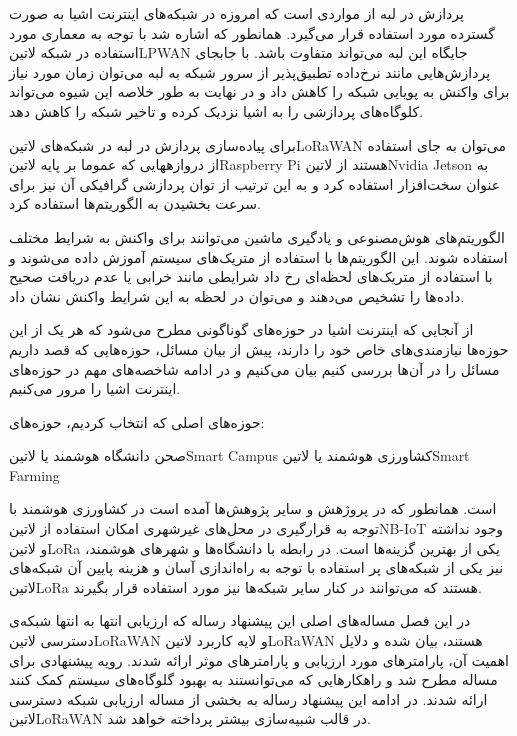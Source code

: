 پردازش در لبه از مواردی است که امروزه در شبکه‌های اینترنت اشیا به صورت گسترده مورد استفاده قرار می‌گیرد.
همانطور که اشاره شد با توجه به معماری مورد استفاده در شبکه ‌لاتین{LPWAN} جایگاه این لبه می‌تواند متفاوت باشد.
با جابجای پردازش‌هایی مانند نرخ‌داده تطبیق‌پذیر از سرور شبکه به لبه می‌توان زمان مورد نیاز برای واکنش به پویایی شبکه را کاهش داد و
در نهایت به طور خلاصه این شیوه می‌تواند کلوگاه‌های پردازشی را به اشیا نزدیک کرده و تاخیر شبکه را کاهش دهد.

برای پیاده‌سازی پردازش در لبه در شبکه‌های ‌لاتین{LoRaWAN} می‌توان به جای استفاده از دروازههایی که عموما بر پایه
‌لاتین{Raspberry Pi} هستند از ‌لاتین{Nvidia Jetson} به عنوان سخت‌افزار استفاده کرد و به این ترتیب از توان پردازشی گرافیکی
آن نیز برای سرعت بخشیدن به الگوریتم‌ها استفاده کرد.


الگوریتم‌های هوش‌مصنوعی و یادگیری ماشین می‌توانند برای واکنش به شرایط مختلف استفاده شوند. این الگوریتم‌ها با استفاده از متریک‌های
سیستم آموزش داده می‌شوند و با استفاده از متریک‌های لحظه‌ای رخ داد شرایطی مانند خرابی یا عدم دریافت صحیح داده‌ها را تشخیص می‌دهند
و می‌توان در لحظه به این شرایط واکنش نشان داد.


از آنجایی که اینترنت اشیا در حوزه‌های گوناگونی مطرح می‌شود که هر یک از این حوزه‌ها نیازمندی‌های خاص خود را دارند، پیش از بیان مسائل، حوزه‌هایی که قصد داریم
مسائل را در آن‌ها بررسی کنیم بیان می‌کنیم و در ادامه شاخصه‌های مهم در حوزه‌های اینترنت اشیا را مرور می‌کنیم.

حوزه‌های اصلی که انتخاب کردیم، حوزه‌های:

 صحن دانشگاه هوشمند یا ‌لاتین{Smart Campus}
 کشاورزی هوشمند یا ‌لاتین{Smart Farming}

است. همانطور که در پروژهش  و سایر پژوهش‌ها آمده است در کشاورزی هوشمند با توجه به قرارگیری در محل‌های غیرشهری امکان استفاده
از ‌لاتین{NB-IoT} وجود نداشته و ‌لاتین{LoRa} یکی از بهترین گزینه‌ها است.
در رابطه با دانشگاه‌ها و شهرهای هوشمند، نیز یکی از شبکه‌های پر استفاده با توجه به راه‌اندازی آسان و هزینه پایین آن شبکه‌های ‌لاتین{LoRa} هستند
که می‌توانند در کنار سایر شبکه‌ها نیز مورد استفاده قرار بگیرند.


در این فصل مساله‌های اصلی این پیشنهاد رساله که ارزیابی انتها به انتها شبکه‌ی دسترسی ‌لاتین{LoRaWAN}
و لایه کاربرد ‌لاتین{LoRaWAN} هستند،
بیان شده و دلایل اهمیت آن، پارامترهای مورد ارزیابی و پارامترهای موثر ارائه شدند.
رویه پیشنهادی برای مساله مطرح شد و راهکارهایی که می‌توانستند به بهبود گلوگاه‌های سیستم کمک کنند ارائه شدند.
در ادامه این پیشنهاد رساله به بخشی از مساله ارزیابی شبکه دسترسی ‌لاتین{LoRaWAN} در قالب شبیه‌سازی بیشتر پرداخته خواهد شد.

